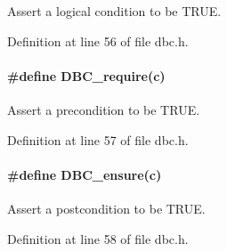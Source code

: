 Assert a logical condition to be TRUE. 

Definition at line 56 of file dbc.h.\hypertarget{group___d_s_p_d_b_c_g7802e65c7b2332144847694c092e02e5}{
\paragraph[DBC\_\-require]{\setlength{\rightskip}{0pt plus 5cm}\#define DBC\_\-require(c)}\hfill}
\label{group___d_s_p_d_b_c_g7802e65c7b2332144847694c092e02e5}


Assert a precondition to be TRUE. 

Definition at line 57 of file dbc.h.\hypertarget{group___d_s_p_d_b_c_gbc8fbe5a1b7e7abb38b8a417da0a6746}{
\paragraph[DBC\_\-ensure]{\setlength{\rightskip}{0pt plus 5cm}\#define DBC\_\-ensure(c)}\hfill}
\label{group___d_s_p_d_b_c_gbc8fbe5a1b7e7abb38b8a417da0a6746}


Assert a postcondition to be TRUE. 

Definition at line 58 of file dbc.h.